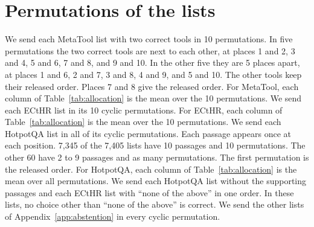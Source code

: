 \section{Permutations of the lists}
\label{app:permutations}
We send each MetaTool list with two correct tools in 10 permutations. In five permutations the two correct tools are next to each other, at places 1 and 2, 3 and 4, 5 and 6, 7 and 8, and 9 and 10. In the other five they are 5 places apart, at places 1 and 6, 2 and 7, 3 and 8, 4 and 9, and 5 and 10. The other tools keep their released order. Places 7 and 8 give the released order. For MetaTool, each column of Table~\ref{tab:allocation} is the mean over the 10 permutations. We send each ECtHR list in its 10 cyclic permutations. For ECtHR, each column of Table~\ref{tab:allocation} is the mean over the 10 permutations. We send each HotpotQA list in all of its cyclic permutations. Each passage appears once at each position. 7,345 of the 7,405 lists have 10 passages and 10 permutations. The other 60 have 2 to 9 passages and as many permutations. The first permutation is the released order. For HotpotQA, each column of Table~\ref{tab:allocation} is the mean over all permutations. We send each HotpotQA list without the supporting passages and each ECtHR list with ``none of the above'' in one order. In these lists, no choice other than ``none of the above'' is correct. We send the other lists of Appendix~\ref{app:abstention} in every cyclic permutation.
